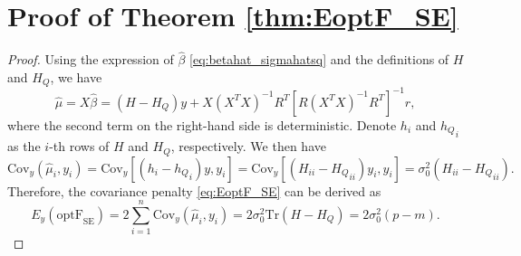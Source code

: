 \section{Proof of Theorem \ref{thm:EoptF_SE}}
\begin{proof}
Using the expression of $\hat\beta$ \eqref{eq:betahat_sigmahatsq} and the definitions of $H$ and $H_Q$, we have
\begin{equation*}
\hat{\mu} = X\hat{\beta} = (H-H_Q)y + X(X^T X)^{-1} R^T \left[ R(X^TX)^{-1}R^T  \right]^{-1}r,
\end{equation*}
where the second term on the right-hand side is deterministic. Denote $h_i$ and ${h_Q}_i$ as the $i$-th rows of $H$ and $H_Q$, respectively. We then have
\begin{equation*}
\text{Cov}_y \left(\hat{\mu}_i, y_i \right) = \text{Cov}_y \left[ (h_i-{h_Q}_i)y, y_i  \right] = \text{Cov}_y \left[ (H_{ii}-{H_Q}_{ii})y_i, y_i \right] = \sigma_0^2 (H_{ii}-{H_Q}_{ii}).
\end{equation*}
Therefore, the covariance penalty \eqref{eq:EoptF_SE} can be derived as
\begin{equation*}
E_y (\text{optF}_\text{SE}) = 2 \sum_{i=1}^n \text{Cov}_y (\hat\mu_i,y_i) = 2 \sigma_0^2 \text{Tr}(H-H_Q) = 2 \sigma_0^2 (p-m).
\end{equation*}
\end{proof}

